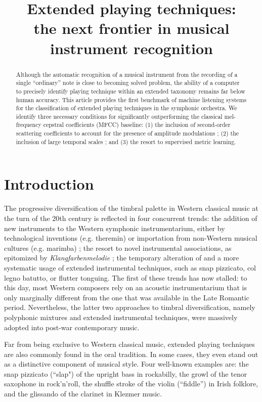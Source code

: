 \documentclass{article}
\title{Extended playing techniques: \\
the next frontier in musical instrument recognition}
\begin{document}
%
\maketitle
%
\begin{abstract}
Although the automatic recognition of a musical instrument from the recording of a single ``ordinary'' note is close to becoming solved problem, the ability of a computer to precisely identify playing technique within an extended taxonomy remains far below human accuracy.
This article provides the first benchmark of machine listening systems for the classification of extended playing techniques in the symphonic orchestra.
We identify three necessary conditions for significantly outperforming the classical mel-frequency cepstral coefficients (MFCC) baseline:
(1) the inclusion of second-order scattering coefficients to account for the presence of amplitude modulations ;
(2) the inclusion of large temporal scales ; and
(3) the resort to supervised metric learning.
\end{abstract}
%
\section{Introduction}\label{sec:introduction}

The progressive diversification of the timbral palette in Western classical music at the turn of the 20th century is reflected in four concurrent trends:
the addition of new instruments to the Western symphonic instrumentarium, either by technological inventions (e.g. theremin) or importation from non-Western musical cultures (e.g. marimba) ;
the resort to novel instrumental associations, as epitomized by \emph{Klangfarbenmelodie} ;
the temporary alteration of
and a more systematic usage of extended instrumental techniques, such as snap pizzicato, col legno batutto, or flutter tonguing.
The first of these trends has now stalled: to this day, most Western composers rely on an acoustic instrumentarium that is only marginally different from the one that was available in the Late Romantic period.
Nevertheless, the latter two approaches to timbral diversification, namely polyphonic mixtures and extended instrumental techniques, were massively adopted into post-war contemporary music.



Far from being exclusive to Western classical music, extended playing techniques are also commonly found in the oral tradition.
In some cases, they even stand out as a distinctive component of musical style.
Four well-known examples are:
the snap pizzicato (``slap") of the upright bass in rockabilly,
the growl of the tenor saxophone in rock'n'roll,
the shuffle stroke of the violin (``fiddle'') in Irish folklore,
and the glissando of the clarinet in Klezmer music.
\end{document}
